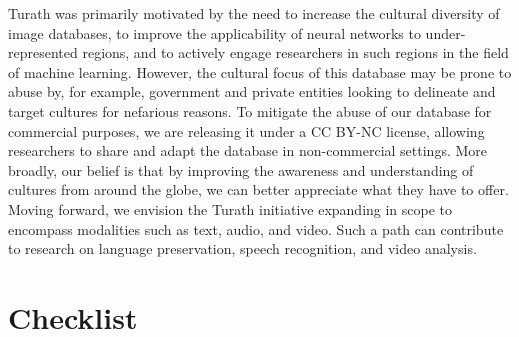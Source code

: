 \documentclass{article}
\begin{document}
Turath was primarily motivated by the need to increase the cultural diversity of image databases, to improve the applicability of neural networks to under-represented regions, and to actively engage researchers in such regions in the field of machine learning. However, the cultural focus of this database may be prone to abuse by, for example, government and private entities looking to delineate and target cultures for nefarious reasons. To mitigate the abuse of our database for commercial purposes, we are releasing it under a CC BY-NC license, allowing researchers to share and adapt the database in non-commercial settings. More broadly, our belief is that by improving the awareness and understanding of cultures from around the globe, we can better appreciate what they have to offer. Moving forward, we envision the Turath initiative expanding in scope to encompass modalities such as text, audio, and video. Such a path can contribute to research on language preservation, speech recognition, and video analysis.




\section*{Checklist}
\end{document}
